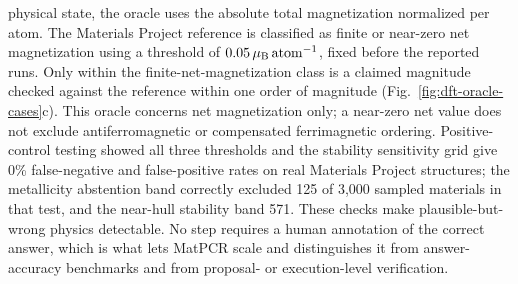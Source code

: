 \documentclass[pdflatex,sn-nature]{sn-jnl}
\newcommand{\rev}[1]{#1}
\newcommand{\rev}[1]{{\color{blue}#1}}
\begin{document}
physical state, the oracle uses the absolute total magnetization normalized per
atom. The Materials Project reference is classified as finite or near-zero net
magnetization using a threshold of
$0.05\,\mu_{\rm B}\,\mathrm{atom}^{-1}$, fixed before the reported runs.
Only within the finite-net-magnetization class is a claimed magnitude checked
against the reference within one order of magnitude
(Fig.~\ref{fig:dft-oracle-cases}c). This oracle concerns net magnetization only;
a near-zero net value does not exclude antiferromagnetic or compensated
ferrimagnetic ordering.
Positive-control testing showed all
three thresholds and the stability sensitivity grid give 0\% false-negative and
false-positive rates on real Materials Project structures; the metallicity abstention band
correctly excluded 125 of 3{,}000 sampled materials in that test\rev{, and the near-hull stability band 571}. These checks make plausible-but-wrong physics detectable.
No step requires a human annotation of the correct answer, which is what lets MatPCR
scale and distinguishes it from answer-accuracy benchmarks and from proposal- or
execution-level verification.
\end{document}
